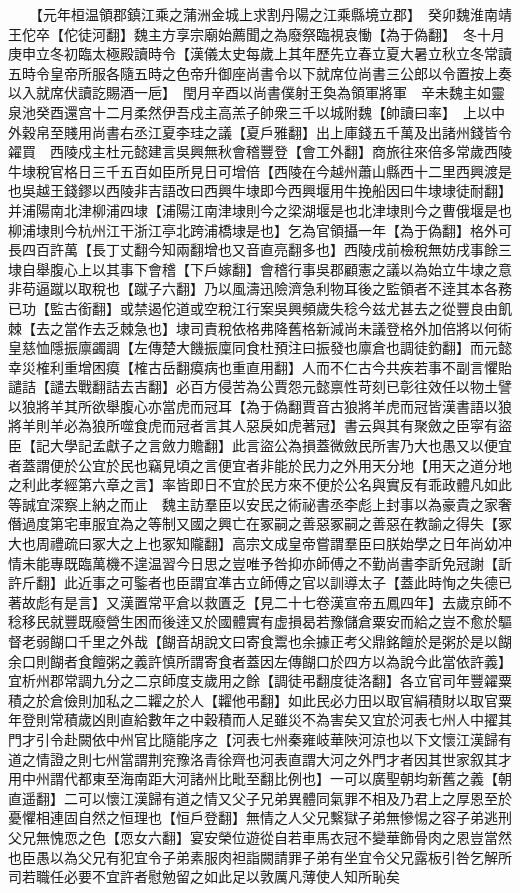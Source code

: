 　　【元年桓温領郡鎮江乘之蒲洲金城上求割丹陽之江乘縣境立郡】　癸卯魏淮南靖王佗卒【佗徒河翻】魏主方享宗廟始薦聞之為廢祭臨視哀慟【為于偽翻】　冬十月庚申立冬初臨太極殿讀時令【漢儀太史每歲上其年歷先立春立夏大暑立秋立冬常讀五時令皇帝所服各隨五時之色帝升御座尚書令以下就席位尚書三公郎以令置按上奏以入就席伏讀訖賜酒一巵】　閏月辛酉以尚書僕射王奐為領軍將軍　辛未魏主如靈泉池癸酉還宫十二月柔然伊吾戍主高羔子帥衆三千以城附魏【帥讀曰率】　上以中外穀帛至賤用尚書右丞江夏李珪之議【夏戶雅翻】出上庫錢五千萬及出諸州錢皆令糴買　西陵戍主杜元懿建言吳興無秋會稽豐登【會工外翻】商旅往來倍多常歲西陵牛埭稅官格日三千五百如臣所見日可增倍【西陵在今越州蕭山縣西十二里西興渡是也吳越王錢鏐以西陵非吉語改曰西興牛埭即今西興堰用牛挽船因曰牛埭埭徒耐翻】并浦陽南北津柳浦四埭【浦陽江南津埭則今之梁湖堰是也北津埭則今之曹俄堰是也柳浦埭則今杭州江干浙江亭北跨浦橋埭是也】乞為官領攝一年【為于偽翻】格外可長四百許萬【長丁丈翻今知兩翻增也又音直亮翻多也】西陵戌前檢稅無妨戌事餘三埭自舉腹心上以其事下會稽【下戶嫁翻】會稽行事吳郡顧憲之議以為始立牛埭之意非苟逼蹴以取稅也【蹴子六翻】乃以風濤迅險濟急利物耳後之監領者不逹其本各務已功【監古銜翻】或禁遏佗道或空稅江行案吳興頻歲失稔今兹尤甚去之從豐良由飢棘【去之當作去乏棘急也】埭司責稅依格弗降舊格新減尚未議登格外加倍將以何術皇慈恤隱振廪蠲調【左傳楚大饑振廩同食杜預注曰振發也廪倉也調徒釣翻】而元懿幸災榷利重增困瘼【榷古岳翻瘼病也重直用翻】人而不仁古今共疾若事不副言懼貽譴詰【譴去戰翻詰去吉翻】必百方侵苦為公賈怨元懿禀性苛刻已彰往效任以物土譬以狼將羊其所欲舉腹心亦當虎而冠耳【為于偽翻賈音古狼將羊虎而冠皆漢書語以狼將羊則羊必為狼所噬食虎而冠者言其人惡戾如虎著冠】書云與其有聚斂之臣寜有盜臣【記大學記孟獻子之言斂力贍翻】此言盜公為損蓋微斂民所害乃大也愚又以便宜者蓋謂便於公宜於民也竊見頃之言便宜者非能於民力之外用天分地【用天之道分地之利此孝經第六章之言】率皆即日不宜於民方來不便於公名與實反有乖政體凡如此等誠宜深察上納之而止　魏主訪羣臣以安民之術祕書丞李彪上封事以為豪貴之家奢僭過度第宅車服宜為之等制又國之興亡在冢嗣之善惡冢嗣之善惡在教諭之得失【冢大也周禮疏曰冢大之上也冢知隴翻】高宗文成皇帝嘗謂羣臣曰朕始學之日年尚幼冲情未能專既臨萬機不遑温習今日思之豈唯予咎抑亦師傅之不勤尚書李訢免冠謝【訢許斤翻】此近事之可鍳者也臣謂宜凖古立師傅之官以訓導太子【蓋此時恂之失德已著故彪有是言】又漢置常平倉以救匱乏【見二十七卷漢宣帝五鳳四年】去歲京師不稔移民就豐既廢營生困而後逹又於國體實有虚損曷若豫儲倉粟安而給之豈不愈於驅督老弱餬口千里之外哉【餬音胡說文曰寄食鬻也余據正考父鼎銘饘於是粥於是以餬余口則餬者食饘粥之義許慎所謂寄食者蓋因左傳餬口於四方以為說今此當依許義】宜析州郡常調九分之二京師度支歲用之餘【調徒弔翻度徒洛翻】各立官司年豐糴粟積之於倉儉則加私之二糶之於人【糶他弔翻】如此民必力田以取官絹積財以取官粟年登則常積歲凶則直給數年之中穀積而人足雖災不為害矣又宜於河表七州人中擢其門才引令赴闕依中州官比隨能序之【河表七州秦雍岐華陜河涼也以下文懷江漢歸有道之情證之則七州當謂荆兖豫洛青徐齊也河表直謂大河之外門才者因其世家叙其才用中州謂代都東至海南距大河諸州比毗至翻比例也】一可以廣聖朝均新舊之義【朝直遥翻】二可以懷江漢歸有道之情又父子兄弟異體同氣罪不相及乃君上之厚恩至於憂懼相連固自然之恒理也【恒戶登翻】無情之人父兄繫獄子弟無慘惕之容子弟逃刑父兄無愧恧之色【恧女六翻】宴安榮位遊從自若車馬衣冠不變華飾骨肉之恩豈當然也臣愚以為父兄有犯宜令子弟素服肉袒詣闕請罪子弟有坐宜令父兄露板引咎乞解所司若職任必要不宜許者慰勉留之如此足以敦厲凡薄使人知所恥矣
